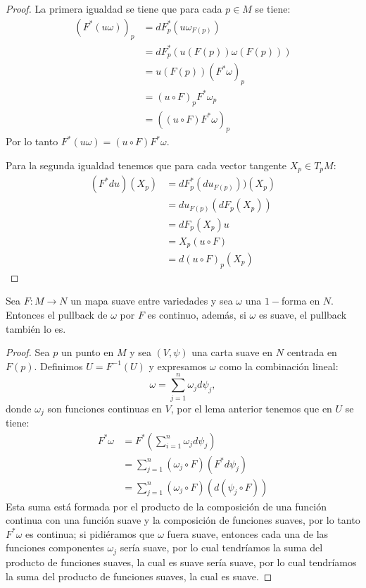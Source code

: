 \begin{proof}
	La primera igualdad se tiene que para cada $p \in M$ se tiene:
	\begin{align*}
		(F^{*}(u\omega))_p & = dF^{*}_{p} (u \omega_{F(p)})    \\
		                   & = dF^*_p ( u(F(p)) \omega(F(p)) ) \\
		                   & = u (F(p)) (F^{*}\omega)_p        \\
		                   & = (u \circ F)_{p} F^{*}\omega_p   \\
		                   & = ((u \circ F) F^*\omega)_p
	\end{align*}
	Por lo tanto $ F^{*}(u \omega) = (u \circ F) F^*\omega $.

	Para la segunda igualdad tenemos que para cada vector tangente $X_p \in T_{p}M$:
	\begin{align*}
		(F^{*}du)(X_p) & = dF_{p}^{*} (du_{F(p)}))(X_p) \\
		               & = du_{F(p)} (dF_{p}(X_p))      \\
		               & = dF_p (X_p)u                  \\
		               & = X_p (u \circ F)              \\
		               & = d(u \circ F)_p (X_p)
	\end{align*}
\end{proof}

\begin{theorem}
	Sea $F: M \to N$ un mapa suave entre variedades y sea $\omega$ una $1-$forma en $N$. Entonces el pullback de $\omega$ por $F$ es continuo, además, si $\omega$ es suave, el pullback también lo es.
\end{theorem}

\begin{proof}
	Sea $p$ un punto en $M$ y sea $(V, \psi)$ una carta suave en $N$ centrada en $F(p)$. Definimos $U = F^{-1}(U)$ y expresamos $\omega$ como la combinación lineal:
	\[
		\omega = \sum_{j=1}^{n} \omega_j d\psi_j,
	\]
	donde $\omega_j$ son funciones continuas en $V$, por el lema anterior tenemos que en $U$ se tiene:
	\begin{align*}
		F^{*} \omega & = F^{*} \left( \sum_{i=1}^{n} \omega_j d\psi_j \right) \\
		             & = \sum_{j=1}^{n} (\omega_j \circ F)(F^{*} d\psi_j)     \\
		             & = \sum_{j=1}^{n} (\omega_j \circ F)(d(\psi_j \circ F))
	\end{align*}
  Esta suma está formada por el producto de la composición de una función continua con una función suave y la composición de funciones suaves, por lo tanto $F^{*}\omega$ es continua; si pidiéramos que $\omega$ fuera suave, entonces cada una de las funciones componentes $\omega_j$ sería suave, por lo cual tendríamos la suma del producto de funciones suaves, la cual es suave sería suave, por lo cual tendríamos la suma del producto de funciones suaves, la cual es suave.
\end{proof}
